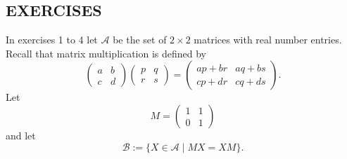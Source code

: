 \subsection*{\centering EXERCISES}
In exercises 1 to 4 let $\mathcal{A}$ be the set of $2\times2$ matrices with real number entries.
Recall that matrix multiplication is defined by
\[
    \begin{pmatrix}
        a&b\\c&d
    \end{pmatrix}
    \begin{pmatrix}
        p&q\\r&s
    \end{pmatrix}
    =
    \begin{pmatrix}
        ap+br&aq+bs\\cp+dr&cq+ds
    \end{pmatrix}.
\]
Let 
\[
    M=\begin{pmatrix}
        1&1\\0&1
    \end{pmatrix}
\]
and let 
\[
    \mathcal{B}:=\{X\in\mathcal{A}\mid MX=XM\}.
\]
